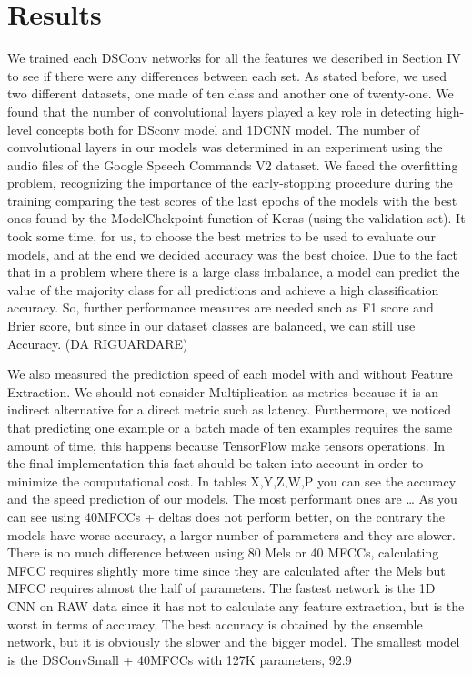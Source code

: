 \documentclass[conference]{IEEEtran}
\begin{document}
\section{Results}
We trained each DSConv networks for all the features we described in Section IV to see if there were any differences between each set. As stated before, we used two different datasets, one made of ten class and another one of twenty-one.
We found that the number of convolutional layers played a key role in detecting high-level concepts both for DSconv model and 1DCNN model. The number of convolutional layers in our models was determined in an experiment using the audio files of the Google Speech Commands V2 dataset.
We faced the overfitting problem, recognizing the importance of the early-stopping procedure during the training comparing the test scores of the last epochs of the models with the best ones found by the ModelChekpoint function of Keras (using the validation set).
It took some time, for us, to choose the best metrics to be used to evaluate our models, and at the end we decided accuracy was the best choice. Due to the fact that in a problem where there is a large class imbalance, a model can predict the value of the majority class for all predictions and achieve a high classification accuracy. So, further performance measures are needed such as F1 score and Brier score, but since in our dataset classes are balanced, we can still use Accuracy. (DA RIGUARDARE)

We also measured the prediction speed of each model with and without Feature Extraction. We should not consider Multiplication as metrics because it is an indirect alternative for a direct metric such as latency.
Furthermore, we noticed that predicting one example or a batch made of ten examples requires the same amount of time, this happens because TensorFlow make tensors operations. In the final implementation this fact should be taken into account in order to minimize the computational cost.
In tables X,Y,Z,W,P you can see the accuracy and the speed prediction of our models.
The most performant ones are …
As you can see using 40MFCCs + deltas does not perform better, on the contrary the models have worse accuracy, a larger number of parameters and they are slower.
There is no much difference between using 80 Mels or 40 MFCCs, calculating MFCC requires slightly more time since they are calculated after the Mels but MFCC requires almost the half of parameters.
The fastest network is the 1D CNN on RAW data since it has not to calculate any feature extraction, but is the worst in terms of accuracy.
The best accuracy is obtained by the ensemble network, but it is obviously the slower and the bigger model.
The smallest model is the DSConvSmall + 40MFCCs with 127K parameters, 92.9%
\end{document}
